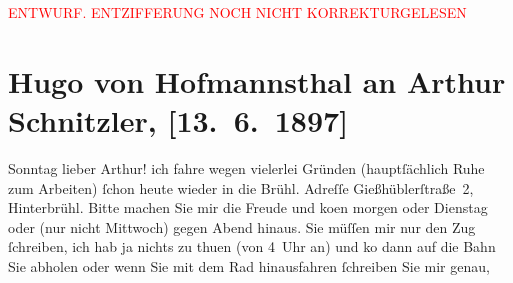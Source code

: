 
\begin{center}
            \textcolor{red}{ENTWURF. ENTZIFFERUNG NOCH NICHT KORREKTURGELESEN}
                      \end{center}
            
               \section[Hugo von Hofmannsthal an Arthur Schnitzler, {[}13. 6. 1897{]}]{ Hugo von Hofmannsthal an Arthur Schnitzler, {[}13. 6. 1897{]}}\nopagebreak{}\rehead{ }\begin{ledgroupsized}[t]{13cm}\normalsize\beginnumbering{} \toendnotes[C]{\smallbreak\pagebreak[2]} 
\toendnotes[C]{\smallbreak}\pstart
           \raggedleft{}{\pb}Sonntag\pend
           \pstart{}lieber Arthur!\pend\pstart
           ich fahre wegen vielerlei Gründen (hauptſächlich Ruhe zum Arbeiten) ſchon heute
                    wieder in die Brühl. Adreſſe Gießhüblerſtraße 2, Hinterbrühl. Bitte machen Sie mir die Freude und ko{\geminationm}en morgen oder Dienstag
                    oder {\pb}\label{K_L00687_1v}\label{K_L00687_1h} (nur nicht Mittwoch) gegen
                    Abend hinaus. Sie müſſen mir nur den Zug ſchreiben, ich hab ja nichts zu thuen
                    (von 4 Uhr an) und ko{\geminationm} dann auf die
                    Bahn Sie abholen oder wenn Sie mit dem Rad hinausfahren ſchreiben Sie mir genau,

\end{ledgroupsized}
